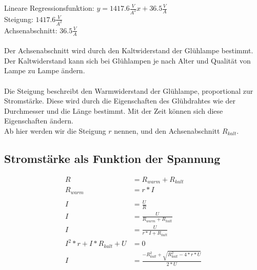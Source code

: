 \documentclass[12pt, a4paper, twoside]{article}
\begin{document}
Lineare Regressionsfunktion:
$y = 1417.6\frac{V}{A^2}x + 36.5\frac{V}{A}$\\
Steigung: $1417.6\frac{V}{A^2}$\\
Achsenabschnitt: $36.5\frac{V}{A}$
\\
\\
Der Achsenabschnitt wird durch den Kaltwiderstand der Glühlampe bestimmt.
Der Kaltwiderstand kann sich bei Glühlampen je nach Alter und Qualität von Lampe zu Lampe ändern.
\\
\\
Die Steigung beschreibt den Warmwiderstand der Glühlampe, proportional zur Stromstärke.
Diese wird durch die Eigenschaften des Glühdrahtes wie der Durchmesser und die Länge bestimmt.
Mit der Zeit können sich diese Eigenschaften ändern.
\\
Ab hier werden wir die Steigung $r$ nennen, und den Achsenabschnitt $R_{kalt}$.
\subsection{Stromstärke als Funktion der Spannung}
\begin{align*}
  R                      & = R_{warm} + R_{kalt}                             \\
  R_{warm}               & = r * I                                           \\
  \\
  I                      & = \frac{U}{R}                                     \\
  I                      & = \frac{U}{R_{warm} + R_{kalt}}                   \\
  I                      & = \frac{U}{r * I + R_{kalt}}                      \\
  I^2*r + I*R_{kalt} + U & = 0                                               \\
  I                      & = \frac{-R_{kalt}^2+\sqrt{R_{kalt}^2-4*r*U}}{2*U}
\end{align*}
\end{document}
